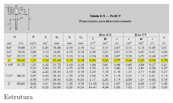 \begin{figure}[h]
    \centering
    \includegraphics[width=0.8\textwidth]{figuras/perfil_t.png}
    \caption{Estrutura}
    \label{fig:awesome_image}
\end{figure}


